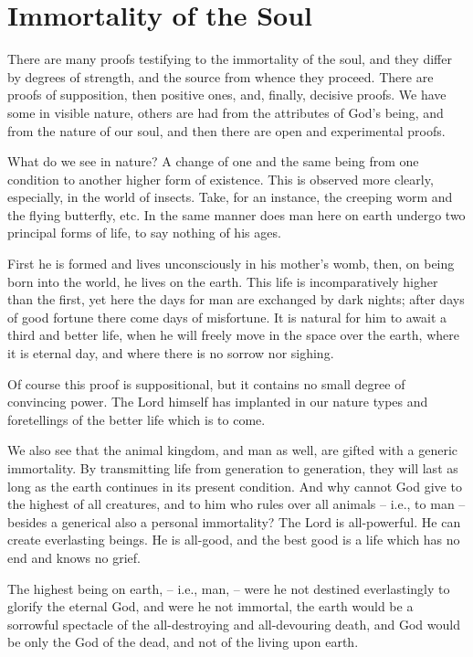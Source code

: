 \chapter{Immortality of the Soul}

There are many proofs testifying to the immortality of the soul, and they differ by degrees of strength, and the source from whence they proceed. There are proofs of supposition, then  positive ones, and, finally, decisive proofs. We have some in visible nature, others are had from the attributes of God's being, and from the nature of our soul, and then there are open and experimental proofs.

What do we see in nature? A change of one and the same being from one condition to another higher form of existence. This is observed more clearly, especially, in the world of insects. Take, for an instance, the creeping worm and the flying butterfly, etc. In the same manner does man here on earth undergo two principal forms of life, to say nothing of his ages.

First he is formed and lives unconsciously in his mother's womb, then, on being born into the world, he lives on the earth. This life is incomparatively higher than the first, yet here the days for man are exchanged by dark nights; after days of good fortune there come days of misfortune. It is natural for him to await a third and better life, when he will freely move in the space over the earth, where it is eternal day, and where there is no sorrow nor sighing.

Of course this proof is suppositional, but it contains no small degree of convincing power. The Lord himself has implanted in our nature types and foretellings of the better life which is to come.

We also see that the animal kingdom, and man as well, are gifted with a generic immortality. By transmitting life from generation to generation, they will last as long as the earth continues in its present condition. And why cannot God give to the highest of all creatures, and to him who rules over all animals -- i.e., to man -- besides a generical also a personal immortality? The Lord is all-powerful. He can create everlasting beings. He is all-good, and the best good is a life which has no end and knows no grief.

The highest being on earth, -- i.e., man, -- were he not destined everlastingly to glorify the eternal God, and were he not immortal, the earth would be a sorrowful spectacle of the all-destroying and all-devouring death, and God would be only the God of the dead, and not of the living upon earth.

